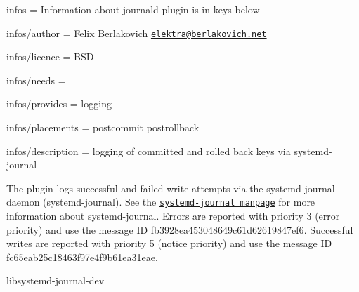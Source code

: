 
\begin{DoxyItemize}
\item infos = Information about journald plugin is in keys below
\item infos/author = Felix Berlakovich \href{mailto:elektra@berlakovich.net}{\tt elektra@berlakovich.\+net}
\item infos/licence = B\+S\+D
\item infos/needs =
\item infos/provides = logging
\item infos/placements = postcommit postrollback
\item infos/description = logging of committed and rolled back keys via systemd-\/journal
\end{DoxyItemize}

The plugin logs successful and failed write attempts via the systemd journal daemon (systemd-\/journal). See the \href{http://www.freedesktop.org/software/systemd/man/systemd-journald.service.html}{\tt systemd-\/journal manpage} for more information about systemd-\/journal. Errors are reported with priority 3 (error priority) and use the message I\+D {\ttfamily fb3928ea453048649c61d62619847ef6}. Successful writes are reported with priority 5 (notice priority) and use the message I\+D {\ttfamily fc65eab25c18463f97e4f9b61ea31eae}.


\begin{DoxyItemize}
\item {\ttfamily libsystemd-\/journal-\/dev} 
\end{DoxyItemize}
